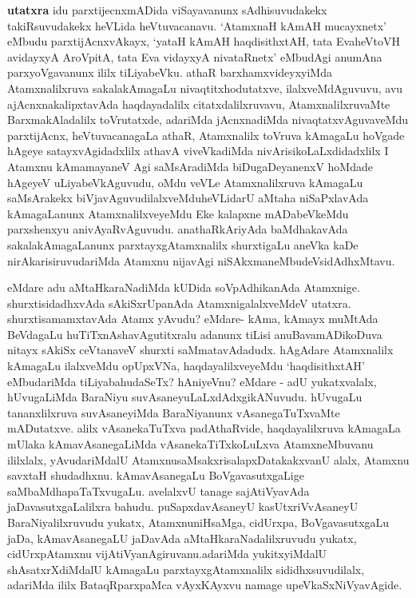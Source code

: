 \begin{artha}

\textbf{utatxra} idu parxtijecnxmADida viSayavanunx sAdhisuvudakekx takiRsuvudakekx heVLida heVtuvacanavu. `AtamxnaH kAmAH mucayxnetx' eMbudu parxtijAcnxvAkayx, `yataH kAmAH haqdisithxtAH, tata EvaheVtoVH avidayxyA AroVpitA, tata Eva vidayxyA nivataRnetx' eMbudAgi anumAna parxyoVgavanunx ililx tiLiyabeVku. athaR barxhamxvideyxyiMda Atamxnalilxruva sakalakAmagaLu nivaqtitxhodutatxve, ilalxveMdAguvuvu, avu ajAcnxnakalipxtavAda haqdayadalilx citatxdalilxruvavu, AtamxnalilxruvaMte BarxmakAladalilx toVrutatxde, adariMda jAcnxnadiMda nivaqtatxvAguvaveMdu parxtijAcnx, heVtuvacanagaLa athaR, Atamxnalilx toVruva kAmagaLu hoVgade hAgeye satayxvAgidadxlilx athavA viveVkadiMda nivArisikoLaLxdidadxlilx I Atamxnu kAmamayaneV Agi saMsAradiMda biDugaDeyanenxV hoMdade hAgeyeV uLiyabeVkAguvudu, oMdu veVLe Atamxnalilxruva kAmagaLu saMsArakekx biVjavAguvudilalxveMdu\break heVLidarU aMtaha niSaPxlavAda kAmagaLanunx AtamxnalilxveyeMdu Eke kalapxne mADabeVkeMdu parxshenxyu anivAyaRvAguvudu. anathaRkAriyAda baMdhakavAda sakalakAmagaLanunx parxtayxgAtamxnalilx shurxtigaLu aneVka kaDe nirAkarisiruvudariMda Atamxnu nijavAgi niSAkxmaneMbudeV\break sidAdhxMtavu.
\end{artha}


\begin{artha}
eMdare adu aMtaHkaraNadiMda kUDida soVpAdhikanAda Atamxnige. shurxtisidadhxvAda sAkiSxrUpanAda AtamxnigalalxveMdeV utatxra. shurxtisamamxtavAda Atamx yAvudu? eMdare- kAma, kAmayx muMtAda BeVdagaLu huTiTxnAshavAgutitxralu adanunx tiLisi anuBavamADikoDuva nitayx sAkiSx ceVtanaveV shurxti saMmatavAdadudx. hAgAdare Atamxnalilx kAmagaLu ilalxveMdu opUpxVNa, haqdayalilxveyeMdu `haqdisithxtAH' eMbudariMda tiLiyabahudaSeTx? hAniyeVnu? eMdare - adU yukatxvalalx, hUvugaLiMda BaraNiyu suvAsaneyuLaLxdAdxgi\break kANuvudu. hUvugaLu tananxlilxruva suvAsaneyiMda BaraNiyanunx vAsanegaTuTxvaMte mADutatxve. alilx vAsanekaTuTxva padAthaRvide, haqdayalilxruva kAmagaLa mUlaka kAmavAsanegaLiMda vAsanekaTiTxkoLuLxva AtamxneMbuvanu ililxlalx, yAvudariMdalU Atamxnu\break saMsakxrisalapxDatakakxvanU alalx, Atamxnu savxtaH shudadhxnu. kAmavAsanegaLu BoVgavasutxgaLige saMbaMdhapaTaTxvugaLu. avelalxvU tanage sajAtiVyavAda jaDavasutxgaLalilxra bahudu. puSapxdavAsaneyU kasUtxriV\break vAsaneyU BaraNiyalilxruvudu yukatx, AtamxnuniHsaMga, cidUrxpa, BoVgavasutxgaLu jaDa, kAmavAsanegaLU jaDavAda aMtaHkaraNadalilxruvudu yukatx, cidUrxpAtamxnu vijAtiVyanAgiruvanu.\break adariMda yukitxyiMdalU shAsatxrXdiMdalU kAmagaLu parxtayxgAtamxnalilx sididhxsuvudilalx, adariMda ililx BataqRparxpaMca vAyxKAyxvu namage upeVkaSxNiVyavAgide.
\end{artha}

